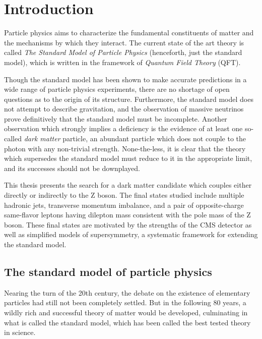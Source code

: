 \chapter{Introduction}
  Particle physics aims to characterize the fundamental constituents of matter and the mechanisms by which they interact. The current state of the art theory is called \emph{The Standard Model of Particle Physics} (henceforth, just the standard model), which is written in the framework of \emph{Quantum Field Theory} (QFT).

  Though the standard model has been shown to make accurate predictions in a wide range of particle physics experiments, there are no shortage of open questions as to the origin of its structure. Furthermore, the standard model does not attempt to describe gravitation, and the observation of massive neutrinos prove definitively that the standard model must be incomplete. Another observation which strongly implies a deficiency is the evidence of at least one so-called \emph{dark matter} particle, an abundant particle which does not couple to the photon with any non-trivial strength. None-the-less, it is clear that the theory which supersedes the standard model must reduce to it in the appropriate limit, and its successes should not be downplayed.

  This thesis presents the search for a dark matter candidate which couples either directly or indirectly to the Z boson. The final states studied include multiple hadronic jets, transverse momentum imbalance, and a pair of opposite-charge same-flavor leptons having dilepton mass consistent with the pole mass of the Z boson. These final states are motivated by the strengths of the CMS detector as well as simplified models of supersymmetry, a systematic framework for extending the standard model. 

\section{The standard model of particle physics}
  Nearing the turn of the 20th century, the debate on the existence of elementary particles had still not been completely settled. But in the following 80 years, a wildly rich and successful theory of matter would be developed, culminating in what is called the standard model, which has been called the best tested theory in science.

